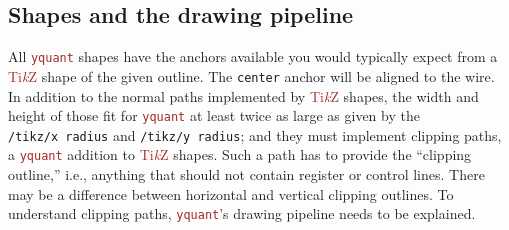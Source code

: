 \documentclass{scrartcl}
\def\TikZ{\textcolor{brown}{Ti\textit kZ}}
\def\pkg#1{\textcolor{brown}{\texttt{#1}}}
\def\Yquant{\pkg{yquant}}
\begin{document}
      \subsection{Shapes and the drawing pipeline}\label{sec:pipeline}
         All \Yquant{} shapes have the anchors available you would typically expect from a \TikZ{} shape of the given outline.
         The \texttt{center} anchor will be aligned to the wire.
         In addition to the normal paths implemented by \TikZ{} shapes, the width and height of those fit for \Yquant{} at least twice as large as given by the \texttt{/tikz/x~radius} and \texttt{/tikz/y~radius}; and they must implement clipping paths, a \Yquant{} addition to \TikZ{} shapes.
         Such a path has to provide the ``clipping outline,'' i.e., anything that should not contain register or control lines.
         There may be a difference between horizontal and vertical clipping outlines.
         To understand clipping paths, \Yquant's drawing pipeline needs to be explained.
\end{document}
